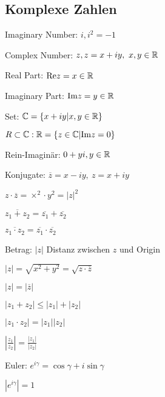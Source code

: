 \subsection{Komplexe Zahlen}
\begin{compactdesc}
    \item[Imaginary Number:] $i, i^2 = -1$
    \item[Complex Number:] $z, z = x + iy, \ x, y \in \mathbb{R}$
        \begin{compactdesc}
            \item[Real Part:] $\text{Re} z = x \in \mathbb{R}$
            \item[Imaginary Part:] $\text{Im} z = y \in \mathbb{R}$
        \end{compactdesc}
    \item[Set:] $\mathbb{C} = \{x + iy | x,y \in \mathbb{R}\}$
        \begin{compactitem}
            \item $R \subset \mathbb{C}: \mathbb{R} = \{z \in \mathbb{C} | \text{Im} z = 0\}$
            \item Rein-Imaginär: $0 + yi, y \in \mathbb{R}$
        \end{compactitem}
    \item[Konjugate:] $\overline{z} = x - iy, \ z = x + iy$
        \begin{compactitem}
            \item $z \cdot \overline{z} = \times^2 \cdot y^2 = |z|^2$
            \item $\overline{z_1 + z_2} = \overline{z_1} + \overline{z_2}$
            \item $\overline{z_1 \cdot z_2} = \overline{z_1} \cdot \overline{z_2}$
        \end{compactitem}
    \item[Betrag:] $|z|$ Distanz zwischen $z$ und Origin
        \begin{compactitem}
            \item $|z| = \sqrt{x^2 + y^2} = \sqrt{z \cdot \overline{z}} $
            \item $|z| = |\overline{z}|$
            \item $|z_1 + z_2| \le |z_1| + |z_2|$
            \item $|z_1 \cdot z_2| = |z_1||z_2|$
            \item $|\frac{z_1}{z_2}| = \frac{|z_1|}{|z_2|}$
        \end{compactitem}
    \item[Euler:] $e^{i\gamma} = \cos \gamma + i \sin \gamma$
        \begin{compactitem}
            \item $|e^{i \gamma}| = 1$
        \end{compactitem}
\end{compactdesc}

